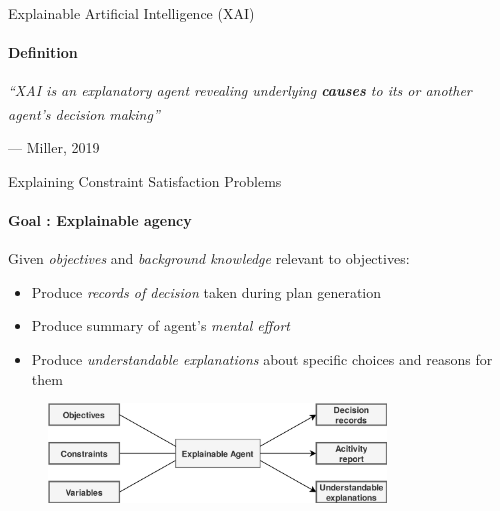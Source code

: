 \documentclass{beamer}
\begin{document}
\begin{frame}{\small{Explainable Artificial Intelligence (XAI)}}
    \framesubtitle{Definition}
    \vspace{1cm}
    \vfill

    \begin{center}
        \emph{``XAI is an explanatory agent revealing underlying \textbf{causes} to its or another agent’s decision making''} \textsuperscript{\citep{miller2019explanation}}
    \end{center}
    \begin{flushright}
        --- Miller, 2019
    \end{flushright}
    \vfill

\end{frame}

\begin{frame}{\small{Explaining Constraint Satisfaction Problems}}
    \framesubtitle{Goal : Explainable agency}
    \vspace{2cm}
    Given \emph{objectives} and \emph{background knowledge} relevant to objectives:
    \begin{itemize}
        \item \small{Produce \emph{records of decision} taken during plan generation}
        \item \small{Produce summary of agent's \emph{mental effort}}
        \item \small{Produce \emph{understandable explanations} about specific choices and reasons for them}
    \end{itemize}
    \vspace*{1em}
    \begin{figure}[]
        \centering
        \includegraphics[width=0.8\textwidth]{figures/explainable_agency2}
    \end{figure}


\end{frame}
\end{document}
